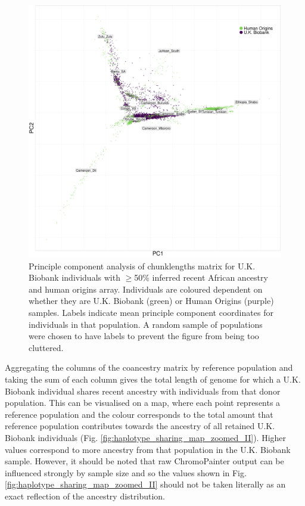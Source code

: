 \begin{figure}[htp]
    \centering
    \includegraphics[width=1.0\textwidth]{../images/chapter3/ChromoPainter_PCA_UKB_HO.pdf}
    \caption{Principle component analysis of chunklengths matrix for U.K. Biobank individuals with $\geq$50\% inferred recent African ancestry and human origins array. Individuals are coloured dependent on whether they are U.K. Biobank (green) or Human Origins (purple) samples. Labels indicate mean principle component coordinates for individuals in that population. A random sample of populations were chosen to have labels to prevent the figure from being too cluttered.}
    \label{fig:PCA_chunklengths_HumanOrigins_U.K.Biobank}
\end{figure}

Aggregating the columns of the coancestry matrix by reference population and taking the sum of each column gives the total length of genome for which a U.K. Biobank individual shares recent ancestry with individuals from that donor population. This can be visualised on a map, where each point represents a reference population and the colour corresponds to the total amount that reference population contributes towards the ancestry of all retained U.K. Biobank individuals (Fig. \ref{fig:haplotype_sharing_map_zoomed_II}). Higher values correspond to more ancestry from that population in the U.K. Biobank sample. However, it should be noted that raw ChromoPainter output can be influenced strongly by sample size and so the values shown in Fig. \ref{fig:haplotype_sharing_map_zoomed_II} should not be taken literally as an exact reflection of the ancestry distribution.

